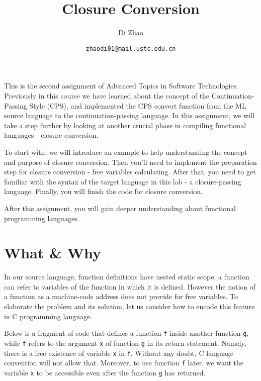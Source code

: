 \documentclass{article}
\theoremstyle{definition}
\theoremstyle{remark}
\numberwithin{equation}{section}
\begin{document}
\newcommand{\env}[1]{[\![#1]\!]\kappa}
\newcommand{\round}[1]{(\!|#1|\!)}

\title{Closure Conversion}%
\author{Di Zhao}%
\date{\small{\texttt{zhaodi01@mail.ustc.edu.cn}}}%

\maketitle

This is the second assignment of Advanced Topics in Software
Technologies. Previously in this course we have learned about the concept
 of the Continuation-Passing Style (CPS), and implemented the CPS convert function
 from the ML source language to the continuation-passing language. In this
 assignment, we will take a step further by looking at another crucial
 phase in compiling functional languages - closure conversion.

To start with, we will introduce an example to help understanding the concept
 and purpose of closure conversion. Then you'll need to implement the preparation
 step for closure conversion - free variables calculating. After that, you need
 to get familiar with the syntax of the target language in this lab - a
 closure-passing language. Finally, you will finish the code for
 closure conversion.

After this assignment, you will gain deeper understanding about functional
 programming languages.

\section{What \& Why}

In our source language, function definitions have nested
static scope, a function can refer to variables of the function in
 which it is defined. However the notion of a function as a machine-code
address does not provide for free variables. To elaborate the problem and
its solution, let us consider how to encode this feature in C programming
language.

Below is a fragment of code that defines a function \texttt{f} inside another
function \texttt{g}, while \texttt{f} refers to the argument \texttt{x} of
function \texttt{g} in its return statement. Namely, there is a free existence
of variable \texttt{x} in \texttt{f}. Without any doubt, C language
convention will not allow that. Moreover, to use function \texttt{f} later, we want
the variable \texttt{x} to be accessible even after the function \texttt{g}
has returned.
\end{document}
